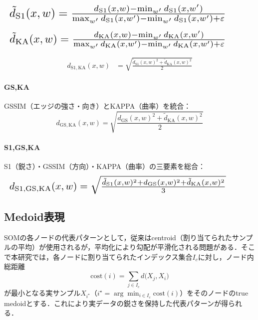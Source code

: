 \documentclass{jarticle}
\theoremstyle{definition}
\newcommand{\halfeq}[2][0.90\linewidth]{%
  \begin{equation}
    \makebox[\linewidth][l]{\resizebox{#1}{!}{\ensuremath{#2}}}%
  \end{equation}
}
\begin{document}
\halfeq{%
\tilde d_{\mathrm{S1}}(x,w)=\frac{d_{\mathrm{S1}}(x,w)-\min_{w'}d_{\mathrm{S1}}(x,w')}{\max_{w'}d_{\mathrm{S1}}(x,w')-\min_{w'}d_{\mathrm{S1}}(x,w')+\varepsilon}}
\halfeq{%
\tilde d_{\mathrm{KA}}(x,w)=\frac{d_{\mathrm{KA}}(x,w)-\min_{w'}d_{\mathrm{KA}}(x,w')}{\max_{w'}d_{\mathrm{KA}}(x,w')-\min_{w'}d_{\mathrm{KA}}(x,w')+\varepsilon}}
\begin{align}
d_{\mathrm{S1,KA}}(x,w)&=\sqrt{\frac{\tilde d_{\mathrm{S1}}(x,w)^2+\tilde d_{\mathrm{KA}}(x,w)^2}{2}}
\end{align}

\paragraph{GS,KA}
GSSIM（エッジの強さ・向き）とKAPPA（曲率）を統合：
\begin{equation}
d_{\mathrm{GS,KA}}(x,w)=\sqrt{\frac{d_{\mathrm{GS}}(x,w)^2+\tilde d_{\mathrm{KA}}(x,w)^2}{2}}
\end{equation}

\paragraph{S1,GS,KA}
S1（鋭さ）・GSSIM（方向）・KAPPA（曲率）の三要素を総合：
\halfeq{%
d_{\mathrm{S1,GS,KA}}(x,w)=\sqrt{\frac{\tilde d_{\mathrm{S1}}(x,w)^2+d_{\mathrm{GS}}(x,w)^2+\tilde d_{\mathrm{KA}}(x,w)^2}{3}}
}

\subsection{Medoid表現}
SOMの各ノードの代表パターンとして，従来はcentroid（割り当てられたサンプルの平均）が使用されるが，平均化により勾配が平滑化される問題がある．そこで本研究では，各ノードに割り当てられたインデックス集合$I_c$に対し，ノード内総距離
\begin{equation}
\mathrm{cost}(i)=\sum_{j\in I_c} d\bigl(X_j, X_i\bigr)
\end{equation}
が最小となる実サンプル$X_{i^\star}$（$i^\star=\arg\min_{i\in I_c}\mathrm{cost}(i)$）をそのノードのtrue medoidとする．これにより実データの鋭さを保持した代表パターンが得られる．
\end{document}
